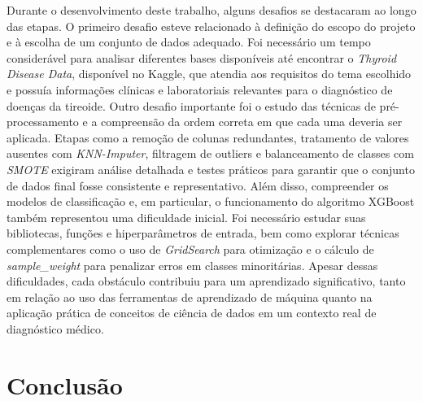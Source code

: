 \documentclass[11pt]{article}
\begin{document}
Durante o desenvolvimento deste trabalho, alguns desafios se destacaram ao longo das etapas. 
O primeiro desafio esteve relacionado à definição do escopo do projeto e à escolha de um conjunto de dados adequado. Foi necessário um tempo considerável para analisar diferentes bases disponíveis até encontrar o \textit{Thyroid Disease Data}, disponível no Kaggle, que atendia aos requisitos do tema escolhido e possuía informações clínicas e laboratoriais relevantes para o diagnóstico de doenças da tireoide.  
Outro desafio importante foi o estudo das técnicas de pré-processamento e a compreensão da ordem correta em que cada uma deveria ser aplicada. Etapas como a remoção de colunas redundantes, tratamento de valores ausentes com \textit{KNN-Imputer}, filtragem de outliers e balanceamento de classes com \textit{SMOTE} exigiram análise detalhada e testes práticos para garantir que o conjunto de dados final fosse consistente e representativo.  
Além disso, compreender os modelos de classificação e, em particular, o funcionamento do algoritmo XGBoost também representou uma dificuldade inicial. Foi necessário estudar suas bibliotecas, funções e hiperparâmetros de entrada, bem como explorar técnicas complementares como o uso de \textit{GridSearch} para otimização e o cálculo de \textit{sample\_weight} para penalizar erros em classes minoritárias.  
Apesar dessas dificuldades, cada obstáculo contribuiu para um aprendizado significativo, tanto em relação ao uso das ferramentas de aprendizado de máquina quanto na aplicação prática de conceitos de ciência de dados em um contexto real de diagnóstico médico.


\section{Conclusão}
\end{document}
